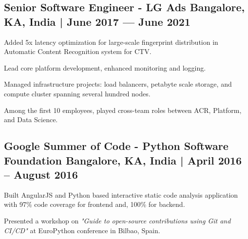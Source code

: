 \subsection{{Senior Software Engineer - LG Ads \hfill Bangalore, KA, India | June 2017 --- June 2021}}
\begin{zitemize}
\item Added 5x latency optimization for large-scale fingerprint distribution in Automatic Content Recognition system for CTV.
\item Lead core platform development, enhanced monitoring and logging. 
\item Managed infrastructure projects: load balancers, petabyte scale storage, and compute cluster spanning several hundred nodes.
\item Among the first 10 employees, played cross-team roles between ACR, Platform, and Data Science.
\end{zitemize}

\subsection{{Google Summer of Code - Python Software Foundation \hfill Bangalore, KA, India | April 2016 -- August 2016}}
\begin{zitemize}
\item Built AngularJS and Python based interactive static code analysis application with 97\% code coverage for frontend and, 100\% for backend.
\item Presented a workshop on \textit{"Guide to open-source contributions using Git and CI/CD"} at EuroPython conference in Bilbao, Spain.
\end{zitemize}